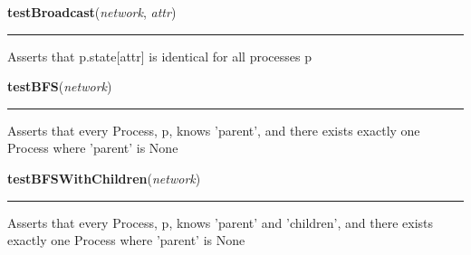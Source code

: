     \label{datk:tests:helpers:testBroadcast}

    \vspace{0.5ex}

\hspace{.8\funcindent}\begin{boxedminipage}{\funcwidth}

    \raggedright \textbf{testBroadcast}(\textit{network}, \textit{attr})

    \vspace{-1.5ex}

    \rule{\textwidth}{0.5\fboxrule}
\setlength{\parskip}{2ex}
    Asserts that p.state[attr] is identical for all processes p

\setlength{\parskip}{1ex}
    \end{boxedminipage}

    \label{datk:tests:helpers:testBFS}

    \vspace{0.5ex}

\hspace{.8\funcindent}\begin{boxedminipage}{\funcwidth}

    \raggedright \textbf{testBFS}(\textit{network})

    \vspace{-1.5ex}

    \rule{\textwidth}{0.5\fboxrule}
\setlength{\parskip}{2ex}
    Asserts that every Process, p, knows 'parent', and there exists exactly
    one Process where 'parent' is None

\setlength{\parskip}{1ex}
    \end{boxedminipage}

    \label{datk:tests:helpers:testBFSWithChildren}

    \vspace{0.5ex}

\hspace{.8\funcindent}\begin{boxedminipage}{\funcwidth}

    \raggedright \textbf{testBFSWithChildren}(\textit{network})

    \vspace{-1.5ex}

    \rule{\textwidth}{0.5\fboxrule}
\setlength{\parskip}{2ex}
    Asserts that every Process, p, knows 'parent' and 'children', and there
    exists exactly one Process where 'parent' is None

\setlength{\parskip}{1ex}
    \end{boxedminipage}

